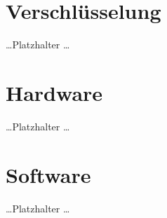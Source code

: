 \newpage


\section{Verschlüsselung}
  \dots Platzhalter \dots
\section{Hardware}
  \dots Platzhalter \dots
\section{Software}
  \dots Platzhalter \dots
